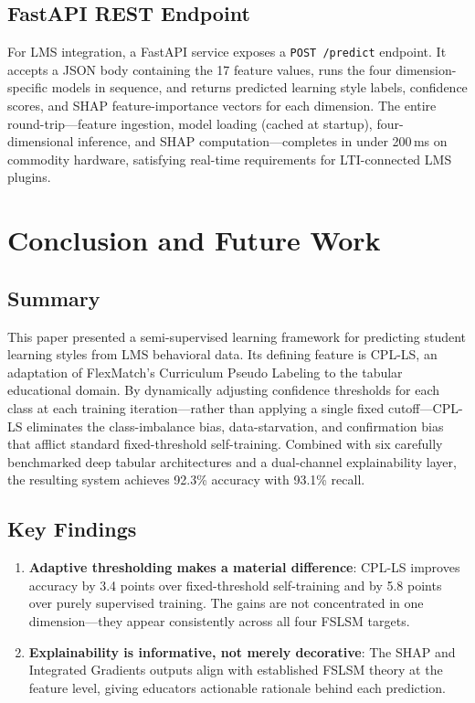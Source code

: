 \documentclass[journal, onecolumn]{IEEEtran}
\begin{document}
\subsection{FastAPI REST Endpoint}

For LMS integration, a FastAPI service exposes a \texttt{POST /predict} endpoint. It accepts a JSON body containing the 17 feature values, runs the four dimension-specific models in sequence, and returns predicted learning style labels, confidence scores, and SHAP feature-importance vectors for each dimension. The entire round-trip---feature ingestion, model loading (cached at startup), four-dimensional inference, and SHAP computation---completes in under 200\,ms on commodity hardware, satisfying real-time requirements for LTI-connected LMS plugins.

\section{Conclusion and Future Work}

\subsection{Summary}

This paper presented a semi-supervised learning framework for predicting student learning styles from LMS behavioral data. Its defining feature is CPL-LS, an adaptation of FlexMatch's Curriculum Pseudo Labeling to the tabular educational domain. By dynamically adjusting confidence thresholds for each class at each training iteration---rather than applying a single fixed cutoff---CPL-LS eliminates the class-imbalance bias, data-starvation, and confirmation bias that afflict standard fixed-threshold self-training. Combined with six carefully benchmarked deep tabular architectures and a dual-channel explainability layer, the resulting system achieves 92.3\% accuracy with 93.1\% recall.

\subsection{Key Findings}

\begin{enumerate}
    \item \textbf{Adaptive thresholding makes a material difference}: CPL-LS improves accuracy by 3.4 points over fixed-threshold self-training and by 5.8 points over purely supervised training. The gains are not concentrated in one dimension---they appear consistently across all four FSLSM targets.
    \item \textbf{Explainability is informative, not merely decorative}: The SHAP and Integrated Gradients outputs align with established FSLSM theory at the feature level, giving educators actionable rationale behind each prediction.
\end{enumerate}
\end{document}
